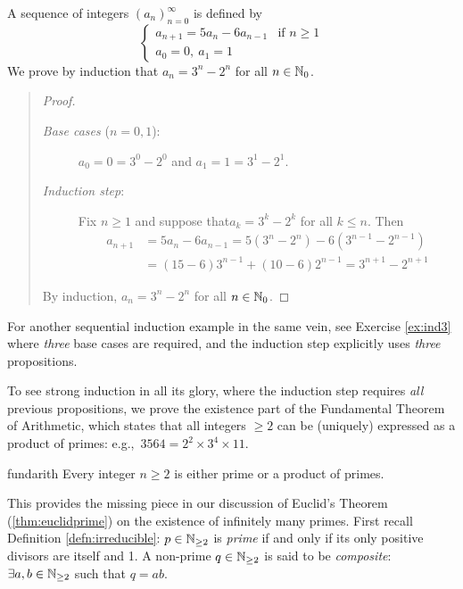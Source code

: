 \begin{example}{}{}
	A sequence of integers $(a_n)_{n=0}^\infty$ is defined by
	\[
		\begin{cases}
			a_{n+1}=5a_n-6a_{n-1}&\text{if }n\ge 1\\
			a_0=0,\ a_1=1
		\end{cases}
	\]
	We prove by induction that $a_n=3^n-2^n$ for all $n\in\mathbb{N}_0$.
	
	\begin{quote}
		\begin{proof}
			\begin{description}
				\item[\normalfont\emph{Base cases} ($n=0,1$):] $a_0=0=3^0-2^0$ and $a_1=1=3^1-2^1$.
				\item[\normalfont\emph{Induction step}:] Fix $n\ge 1$ and suppose that$a_k=3^k-2^k$ for all $k\le n$. Then
				\begin{align*}
					a_{n+1}&=5a_n-6a_{n-1}=5(3^n-2^n)-6(3^{n-1}-2^{n-1})\\
					&=(15-6)3^{n-1}+(10-6)2^{n-1}=3^{n+1}-2^{n+1}
				\end{align*}
			\end{description} 
			By induction, $a_n=3^n-2^n$ for all $n\in\mathbb{N}_0$.
		\end{proof}
	\end{quote}
\end{example}

\goodbreak


For another sequential induction example in the same vein, see Exercise \ref{ex:ind3} where \emph{three} base cases are required, and the induction step explicitly uses \emph{three} propositions.\medbreak

To see strong induction in all its glory, where the induction step requires \emph{all} previous propositions, we prove the existence part of the Fundamental Theorem of Arithmetic, which states that all integers $\ge 2$ can be (uniquely) expressed as a product of primes: e.g.,\ $3564=2^2\times 3^4\times 11$. 


\begin{thm}{}{fundarith}
	Every integer $n\ge 2$ is either prime or a product of primes.
\end{thm}

This provides the missing piece in our discussion of Euclid's Theorem (\ref{thm:euclidprime}) on the existence of infinitely many primes. First recall Definition \ref{defn:irreducible}: $p\in\mathbb{N}_{\ge 2}$ is \emph{prime} if and only if its only positive divisors are itself and 1. A non-prime $q\in\mathbb{N}_{\ge 2}$ is said to be \emph{composite}: $\exists a,b\in\mathbb{N}_{\ge 2}$ such that $q=ab$.


